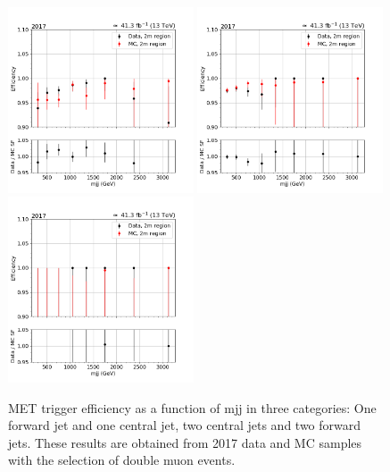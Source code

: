 \begin{figure}[htp]
    \begin{center}
        \includegraphics[width=0.49\textwidth]{fig/efficiency/trigger/met/mjj/data_mc_comparison_2m_2017_one_jet_forward_one_jet_central.png}
        \includegraphics[width=0.49\textwidth]{fig/efficiency/trigger/met/mjj/data_mc_comparison_2m_2017_two_central_jets.png} \\
        \includegraphics[width=0.49\textwidth]{fig/efficiency/trigger/met/mjj/data_mc_comparison_2m_2017_two_forward_jets.png}
    \end{center}
    \caption{MET trigger efficiency as a function of mjj in three categories: One forward jet and one central jet, two central jets and
            two forward jets. These results are obtained from 2017 data and MC samples with the selection of double muon events.}
    \label{fig:eff_mjj_2017_2m}
\end{figure}

